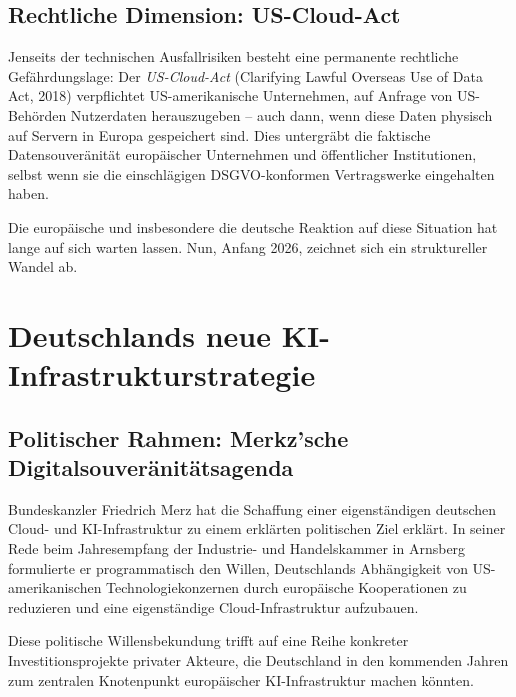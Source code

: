 ﻿\documentclass[12pt, a4paper, openany]{report}
\begin{document}
\subsection{Rechtliche Dimension: US-Cloud-Act}

Jenseits der technischen Ausfallrisiken besteht eine permanente rechtliche
Gefährdungslage: Der \emph{US-Cloud-Act} (Clarifying Lawful Overseas Use
of Data Act, 2018) verpflichtet US-amerikanische Unternehmen, auf Anfrage
von US-Behörden Nutzerdaten herauszugeben -- auch dann, wenn diese Daten
physisch auf Servern in Europa gespeichert sind. Dies untergräbt die
faktische Datensouveränität europäischer Unternehmen und öffentlicher
Institutionen, selbst wenn sie die einschlägigen DSGVO-konformen
Vertragswerke eingehalten haben.

Die europäische und insbesondere die deutsche Reaktion auf diese Situation
hat lange auf sich warten lassen. Nun, Anfang 2026, zeichnet sich ein
struktureller Wandel ab.

\section{Deutschlands neue KI-Infrastrukturstrategie}
\label{sec:deutschland_strategie}

\subsection{Politischer Rahmen: Merkz'sche Digitalsouveränitätsagenda}

Bundeskanzler Friedrich Merz hat die Schaffung einer eigenständigen deutschen
Cloud- und KI-Infrastruktur zu einem erklärten politischen Ziel erklärt.
In seiner Rede beim Jahresempfang der Industrie- und Handelskammer in Arnsberg
formulierte er programmatisch den Willen, Deutschlands Abhängigkeit von US-amerikanischen
Technologiekonzernen durch europäische Kooperationen zu reduzieren
und eine eigenständige Cloud-Infrastruktur aufzubauen.

Diese politische Willensbekundung trifft auf eine Reihe konkreter
Investitionsprojekte privater Akteure, die Deutschland in den kommenden Jahren
zum zentralen Knotenpunkt europäischer KI-Infrastruktur machen könnten.
\end{document}
